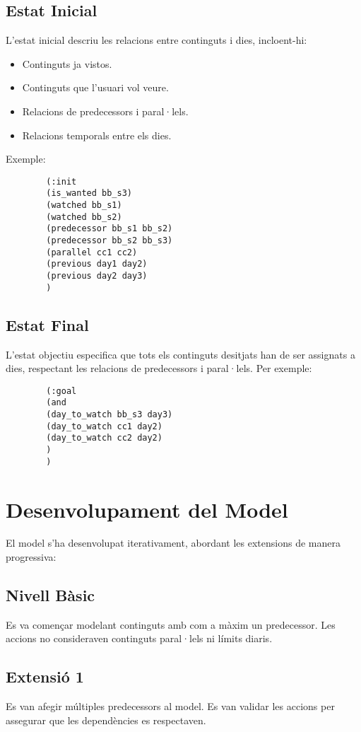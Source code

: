 \documentclass[a4paper]{article}
\begin{document}
	\subsection{Estat Inicial}
	L'estat inicial descriu les relacions entre continguts i dies, incloent-hi:
	\begin{itemize}
		\item Continguts ja vistos.
		\item Continguts que l'usuari vol veure.
		\item Relacions de predecessors i paral·lels.
		\item Relacions temporals entre els dies.
	\end{itemize}
	
	Exemple:
	\begin{verbatim}
		(:init
		(is_wanted bb_s3)
		(watched bb_s1)
		(watched bb_s2)
		(predecessor bb_s1 bb_s2)
		(predecessor bb_s2 bb_s3)
		(parallel cc1 cc2)
		(previous day1 day2)
		(previous day2 day3)
		)
	\end{verbatim}
	
	\subsection{Estat Final}
	L'estat objectiu especifica que tots els continguts desitjats han de ser assignats a dies, respectant les relacions de predecessors i paral·lels. Per exemple:
	\begin{verbatim}
		(:goal
		(and
		(day_to_watch bb_s3 day3)
		(day_to_watch cc1 day2)
		(day_to_watch cc2 day2)
		)
		)
	\end{verbatim}
	
	\newpage
	\section{Desenvolupament del Model}
	El model s'ha desenvolupat iterativament, abordant les extensions de manera progressiva:
	
	\subsection{Nivell Bàsic}
	Es va començar modelant continguts amb com a màxim un predecessor. Les accions no consideraven continguts paral·lels ni límits diaris.
	
	\subsection{Extensió 1}
	Es van afegir múltiples predecessors al model. Es van validar les accions per assegurar que les dependències es respectaven.
	
\end{document}
